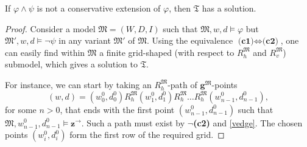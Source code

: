 \documentclass{lmcs} %
\theoremstyle{plain}\newtheorem{satz}[thm]{Satz} %
\newcommand{\tiling}{\mathfrak T}
\newcommand{\bbvarright}{\Zvar^\to}
\newcommand{\fform}[1]{\boldsymbol{#1}}
\newcommand{\gvar}{\fform{g}}
\newcommand{\Zvar}{\fform{z}}
\begin{document}
\begin{lem}\label{lem:ifnosolthencons}
	If $\varphi \wedge \psi$ is not a conservative extension of $\varphi$, then $\tiling$ has a solution.
\end{lem}
%
\begin{proof}
	Consider a model $\mathfrak{M}=(W,D,I)$ such that $\mathfrak{M},w,d\models \varphi$ but 
	$\mathfrak{M}',w,d\models \neg\psi$
	in any variant $\mathfrak M'$ of $\mathfrak{M}$.
	Using the equivalence $\textbf{(c1)} \Leftrightarrow \textbf{(c2)}$, one can easily find within $\mathfrak{M}$ a finite grid-shaped (with respect to $R_{h}^\mathfrak M$ and 
	$R_{v}^\mathfrak M$) submodel, which gives a solution to $\tiling$. 
	
	For instance, we can start by taking an $R_{h}^\mathfrak M$-path of $\gvar^\mathfrak M$-points
	$$
	(w,d) = (w_0^0,d_0^0) R_{h}^\mathfrak M (w_1^0,d_1^0) R_{h}^\mathfrak M \dots R_{h}^\mathfrak M (w_{n-1}^0,d_{n-1}^0),
	$$
	for some $n>0$, that ends with the first point $(w_{n-1}^0,d_{n-1}^0)$ such that 
	$\mathfrak M,w_{n-1}^0,d_{n-1}^0\models \bbvarright$. Such a path must exist by $\neg$\textbf{(c2)} and \eqref{vedge}.  The chosen points $(w_i^0,d_i^0)$ form the first row of the required grid. 
	

\end{proof}
\end{document}
